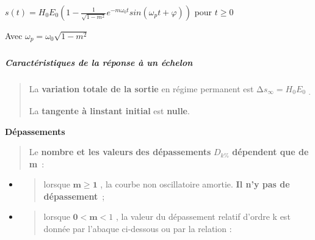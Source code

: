 \(s(t) = H_{0}E_{0}\left( 1 - \frac{1}{\sqrt{1 - m^{2}}}e^{- m\omega_{0}t}sin\left( \omega_{p}t + \varphi \right) \right)\) pour \(t \geq 0\)

Avec \(\omega_{p} = \omega_{0}\sqrt{1 - m^{2}}\)

\hypertarget{section-4}{%
\subparagraph*{}\label{section-4}}

\hypertarget{section-5}{%
\subparagraph*{}\label{section-5}}

\hypertarget{section-6}{%
\subparagraph*{}\label{section-6}}

\hypertarget{section-7}{%
\subparagraph*{}\label{section-7}}

\hypertarget{section-8}{%
\subparagraph*{}\label{section-8}}

\hypertarget{section-9}{%
\subparagraph*{}\label{section-9}}

\hypertarget{section-10}{%
\subparagraph*{}\label{section-10}}

\hypertarget{section-11}{%
\subparagraph*{}\label{section-11}}

\hypertarget{caractuxe9ristiques-de-la-ruxe9ponse-uxe0-un-uxe9chelon}{%
\subparagraph*{Caractéristiques de la réponse à un échelon}\label{caractuxe9ristiques-de-la-ruxe9ponse-uxe0-un-uxe9chelon}}

\begin{quote}
La \textbf{variation totale de la sortie} en régime permanent est \({\mathrm{\Delta}s}_{\infty} = H_{0}E_{0}\) \textsubscript{.}

La \textbf{tangente à l\textquotesingle instant initial} est \textbf{nulle}.
\end{quote}

\textbf{Dépassements}

\begin{quote}
Le \textbf{nombre et les valeurs} \textbf{des dépassements} \(D_{k\%}\) \textbf{dépendent que de m}~:
\end{quote}

\begin{itemize}
\item
  \begin{quote}
  lorsque \(\mathbf{m \geq 1}\) , la courbe non oscillatoire amortie. \textbf{Il n'y pas de dépassement}~;
  \end{quote}
\item
  \begin{quote}
  lorsque \(\mathbf{0} < \mathbf{m}\mathbf{<}1\) , la valeur du dépassement relatif d'ordre k est donnée par l'abaque ci-dessous ou par la relation :
  \end{quote}
\end{itemize}

